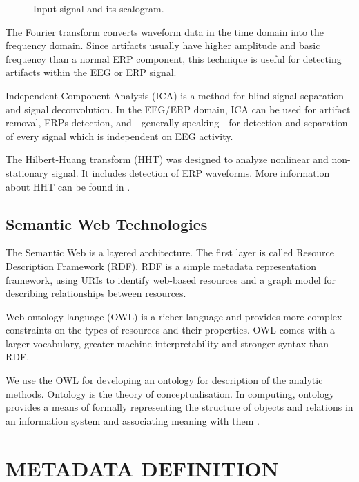\documentclass[a4paper,twoside]{article}
\begin{document}
\begin{figure}[!h]

  \centering
   {}
  \caption{Input signal and its scalogram. \cite{Rondik12} }
  \label{fig:scalogram}
 \end{figure}

The Fourier transform converts waveform data in the time domain into the frequency domain. Since artifacts usually have higher amplitude and basic frequency than a normal ERP component, this technique is useful for detecting artifacts
within the EEG or ERP signal.

Independent Component Analysis (ICA) \cite{Hyv01} is a method for blind signal separation and signal deconvolution.
In the EEG/ERP domain, ICA can be used for artifact removal, ERPs detection, and - generally speaking - for detection
and separation of every signal which is independent on EEG activity.

The  Hilbert-Huang  transform  (HHT)  was  designed  to  analyze  nonlinear  and  non-stationary signal. It includes detection of ERP waveforms.
More information about HHT can be found in \cite{Ciniburk11}.

\subsection{Semantic Web Technologies}

\noindent The Semantic Web is a layered architecture. The first layer
is called Resource Description Framework (RDF). RDF is
a simple metadata representation framework, using URIs to
identify web-based resources and a graph model for describing
relationships between resources.

Web ontology language (OWL) is a richer language and
provides more complex constraints on the types of resources
and their properties. OWL comes with a larger vocabulary,
greater machine interpretability and stronger syntax than RDF.

We use the OWL for developing an ontology for description of the analytic methods. Ontology is the theory of conceptualisation. In computing, ontology
provides a means of formally representing the structure of objects and relations in an information system and associating meaning with them \cite{Sun07}.


\section{\uppercase{Metadata Definition}}
\end{document}
